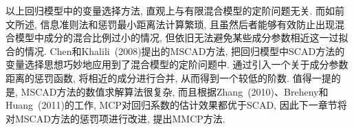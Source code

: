 \documentclass[a4paper,12pt,openany,oneside,utf-8]{ctexbook}
\begin{document}
以上回归模型中的变量选择方法, 直观上与有限混合模型的定阶问题无关. 而如前文所述, 信息准则法和惩罚最小距离法计算繁琐, 且虽然后者能够有效防止出现混合模型中成分的混合比例过小的情况, 但依旧无法避免某些成分参数相近这一过拟合的情况. Chen和Khalili~(2008)提出的MSCAD方法, 把回归模型中SCAD方法的变量选择思想巧妙地应用到了混合模型的定阶问题中. 通过引入一个关于成分参数距离的惩罚函数, 将相近的成分进行合并, 从而得到一个较低的阶数. 值得一提的是, MSCAD方法的数值求解算法很复杂, 而且根据Zhang~(2010)、Breheny和Huang~(2011)的工作, MCP对回归系数的估计效果都优于SCAD, 因此下一章节将对MSCAD方法的惩罚项进行改进, 提出MMCP方法.

\end{document}
